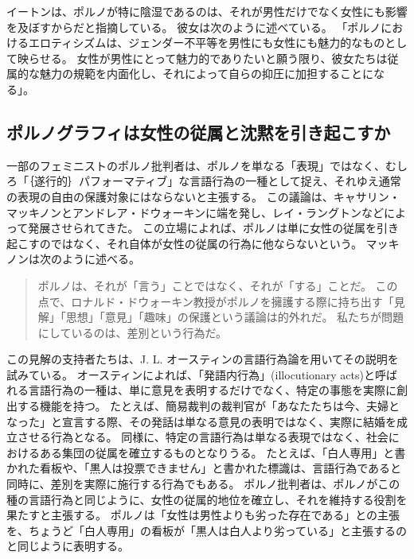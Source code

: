 \documentclass[paper=a4,book,openany]{jlreq}
\newcommand{\ig}[1]{}           %
\begin{document}
イートンは、ポルノが特に陰湿であるのは、それが男性だけでなく女性にも影響を及ぼすからだと指摘している。
彼女は次のように述べている。
「ポルノにおけるエロティシズムは、ジェンダー不平等を男性にも女性にも魅力的なものとして映らせる。
女性が男性にとって魅力的でありたいと願う限り、彼女たちは従属的な魅力の規範を内面化し、それによって自らの抑圧に加担することになる」\citep[p.679]{eaton07:sensibleantiporn}。

\subsection{ポルノグラフィは女性の従属と沈黙を引き起こすか}

一部のフェミニストのポルノ批判者は、ポルノを単なる「表現」ではなく、むしろ「｛遂行的｝{パフォーマティブ}」な言語行為の一種として捉え、それゆえ通常の表現の自由の保護対象にはならないと主張する。
この議論は、キャサリン・マッキノンとアンドレア・ドウォーキン\ig{Andrea Dworkin}に端を発し、レイ・ラングトンなどによって発展させられてきた。
この立場によれば、ポルノは単に女性の従属を引き起こすのではなく、それ自体が女性の従属の行為に他ならないという。
マッキノンは次のように述べる。

\begin{quote}
ポルノは、それが「言う」ことではなく、それが「する」ことだ。
この点で、ロナルド・ドウォーキン\ig{Ronald Dworkin}教授がポルノを擁護する際に持ち出す「見解」「思想」「意見」「趣味」の保護という議論は的外れだ。
私たちが問題にしているのは、差別という行為だ。
\citep{mackinnon94:_pornog}
\end{quote}

この見解の支持者たちは、J. L. オースティンの言語行為論を用いてその説明を試みている。
オースティンによれば、「発語内行為」(illocutionary acts)と呼ばれる言語行為の一種は、単に意見を表明するだけでなく、特定の事態を実際に創出する機能を持つ\citep[pp.116ff, 121, 139]{austin75:_how_to_do_thing_with_words}。
たとえば、簡易裁判の裁判官が「あなたたちは今、夫婦となった」と宣言する際、その発話は単なる意見の表明ではなく、実際に結婚を成立させる行為となる。
同様に、特定の言語行為は単なる表現ではなく、社会におけるある集団の従属を確立するものとなりうる。
たとえば、「白人専用」と書かれた看板や、「黒人は投票できません」と書かれた標識は、言語行為であると同時に、差別を実際に施行する行為でもある。
ポルノ批判者は、ポルノがこの種の言語行為と同じように、女性の従属的地位を確立し、それを維持する役割を果たすと主張する。
ポルノは「女性は男性よりも劣った存在である」との主張を、ちょうど「白人専用」の看板が「黒人は白人より劣っている」と主張するのと同じように表明する。
\end{document}
